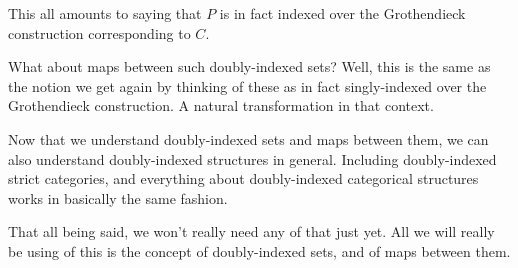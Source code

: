 This all amounts to saying that $P$ is in fact indexed over the Grothendieck construction corresponding to $C$.

What about maps between such doubly-indexed sets? Well, this is the same as the notion we get again by thinking of these as in fact singly-indexed over the Grothendieck construction. A natural transformation in that context.

Now that we understand doubly-indexed sets and maps between them, we can also understand doubly-indexed structures in general. Including doubly-indexed strict categories, and everything about doubly-indexed categorical structures works in basically the same fashion.

That all being said, we won't really need any of that just yet. All we will really be using of this is the concept of doubly-indexed sets, and of maps between them.